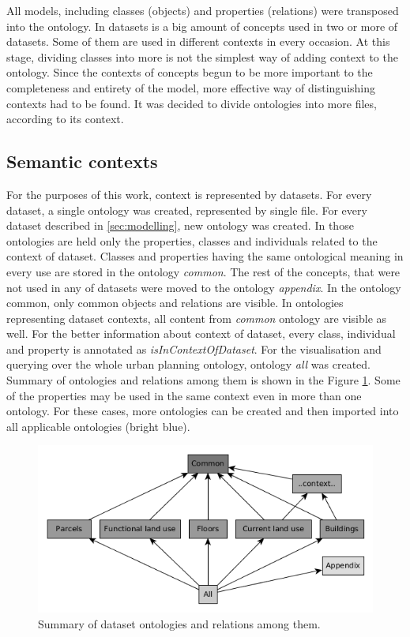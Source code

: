 \documentclass{lncs-template/llncs}
\begin{document}

All models, including classes (objects) and properties (relations) were transposed into the ontology. In datasets is a big amount of concepts used in two or more of datasets. Some of them are used in different contexts in every occasion. At this stage, dividing classes into more is not the simplest way of adding context to the ontology. Since the contexts of concepts begun to be more important to the completeness and entirety of the model, more effective way of distinguishing contexts had to be found. It was decided to divide ontologies into more files, according to its context. 

\subsection{Semantic contexts}

For the purposes of this work, context is represented by datasets. For every dataset, a single ontology was created, represented by single file. For every dataset described in \ref{sec:modelling}, new ontology was created. In those ontologies are held only the properties, classes and individuals related to the context of dataset. Classes and properties having the same ontological meaning in every use are stored in the ontology \textit{common}. The rest of the concepts, that were not used in any of datasets were moved to the ontology \textit{appendix}. In the ontology common, only common objects and relations are visible. In ontologies representing dataset contexts, all content from \textit{common} ontology are visible as well. For the better information about context of dataset, every class, individual and property is annotated as \textit{isInContextOfDataset}. For the visualisation and querying over the whole urban planning ontology, ontology \textit{all} was created. Summary of ontologies and relations among them is shown in the Figure \ref{fig:ontologies_summary}. Some of the properties may be used in the same context even in more than one ontology. For these cases, more ontologies can be created and then imported into all applicable ontologies (bright blue).

\begin{figure}
 \includegraphics[width=1.0\textwidth]{images/ontologies.png}
 \caption{Summary of dataset ontologies and relations among them.}\label{fig:ontologies_summary}
\end{figure}
\end{document}
